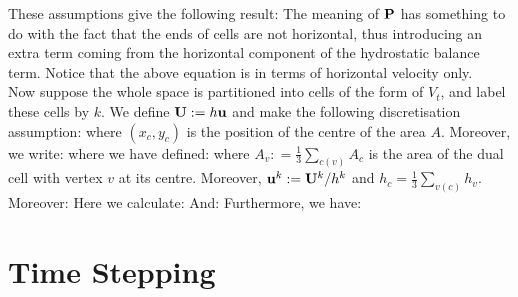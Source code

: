 \documentclass[10pt]{article}
\begin{document}
These assumptions give the following result:
The meaning of $\mathbf{P}$ has something to do with the fact that the ends of cells are not horizontal, thus introducing an extra term coming from the horizontal component of the hydrostatic balance term. Notice that the above equation is in terms of horizontal velocity only. \\
\linebreak
Now suppose the whole space is partitioned into cells of the form of $V_{t}$, and label these cells by $k$. We define $\mathbf{U} : = h\mathbf{u}$ and make the following discretisation assumption:
where $(x_{c},y_{c})$ is the position of the centre of the area $A$. Moreover, we write:
where we have defined:
where $A_{v} :  = \frac{1}{3}\sum_{c(v)} A_{c}$ is the area of the dual cell with vertex $v$ at its centre. Moreover, $\mathbf{u}^{k} : = \mathbf{U}^{k}/h^{k}$ and $h_{c} = \frac{1}{3}\sum_{v(c)} h_{v}$.\\
\linebreak
Moreover:
Here we calculate:
And:
Furthermore, we have:
\section{Time Stepping}
\end{document}
